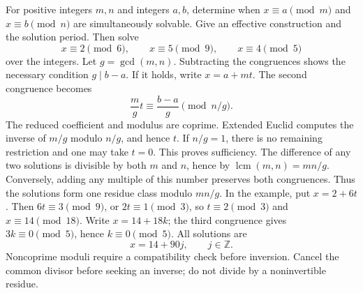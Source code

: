 For positive integers $m,n$ and integers $a,b$, determine when $x\equiv a\pmod m$ and $x\equiv b\pmod n$ are simultaneously solvable. Give an effective construction and the solution period. Then solve
\[
 x\equiv2\pmod6,\qquad x\equiv5\pmod9,
 \qquad x\equiv4\pmod5
\]
over the integers.
\solution Let $g=\gcd(m,n)$. Subtracting the congruences shows the necessary condition $g\mid b-a$. If it holds, write $x=a+mt$. The second congruence becomes
\[
 \frac m g t\equiv\frac{b-a}{g}\pmod{n/g}.
\]
The reduced coefficient and modulus are coprime. Extended Euclid computes the inverse of $m/g$ modulo $n/g$, and hence $t$. If $n/g=1$, there is no remaining restriction and one may take $t=0$. This proves sufficiency.
The difference of any two solutions is divisible by both $m$ and $n$, hence by $\operatorname{lcm}(m,n)=mn/g$. Conversely, adding any multiple of this number preserves both congruences. Thus the solutions form one residue class modulo $mn/g$.
In the example, put $x=2+6t$. Then $6t\equiv3\pmod9$, or $2t\equiv1\pmod3$, so $t\equiv2\pmod3$ and $x\equiv14\pmod{18}$. Write $x=14+18k$; the third congruence gives $3k\equiv0\pmod5$, hence $k\equiv0\pmod5$. All solutions are
\[
 \boxed{x=14+90j,\qquad j\in\mathbb Z}.
\]
\insight Noncoprime moduli require a compatibility check before inversion. Cancel the common divisor before seeking an inverse; do not divide by a noninvertible residue.

